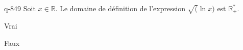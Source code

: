 \begin{truefalse}{q-849}
Soit $x\in \mathbb R$. Le domaine de définition de l'expression $\sqrt(\ln x)$ est $\mathbb R_+^*$.
\item Vrai
\item* Faux
\end{truefalse}

